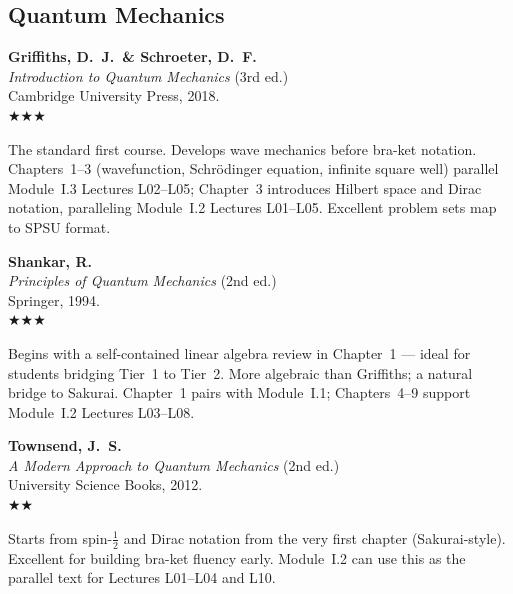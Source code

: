 \documentclass[11pt,a4paper]{article}
\newcommand{\essential}{$\bigstar\bigstar\bigstar$}
\newcommand{\recommended}{$\bigstar\bigstar$}
\newenvironment{bibentry}[1]{%
  \begin{tcolorbox}[entrybox=#1, top=4pt, bottom=4pt]%
}{%
  \end{tcolorbox}\smallskip%
}
\begin{document}
\subsection{Quantum Mechanics}

\begin{bibentry}{t2light}
\textbf{Griffiths, D.~J.\ \& Schroeter, D.~F.}\\
\textit{Introduction to Quantum Mechanics} (3rd ed.)\\
Cambridge University Press, 2018.\\[4pt]
\essential\\[4pt]
\begin{tcolorbox}[annotbox]
The standard first course. Develops wave mechanics before bra-ket notation.
Chapters~1--3 (wavefunction, Schr\"odinger equation, infinite square well) parallel
Module~I.3 Lectures L02--L05; Chapter~3 introduces Hilbert space and Dirac notation,
paralleling Module~I.2 Lectures L01--L05. Excellent problem sets map to SPSU format.
\end{tcolorbox}
\end{bibentry}

\begin{bibentry}{t2light}
\textbf{Shankar, R.}\\
\textit{Principles of Quantum Mechanics} (2nd ed.)\\
Springer, 1994.\\[4pt]
\essential\\[4pt]
\begin{tcolorbox}[annotbox]
Begins with a self-contained linear algebra review in Chapter~1 --- ideal for
students bridging Tier~1 to Tier~2. More algebraic than Griffiths; a natural
bridge to Sakurai. Chapter~1 pairs with Module~I.1; Chapters~4--9 support
Module~I.2 Lectures L03--L08.
\end{tcolorbox}
\end{bibentry}

\begin{bibentry}{t2light}
\textbf{Townsend, J.~S.}\\
\textit{A Modern Approach to Quantum Mechanics} (2nd ed.)\\
University Science Books, 2012.\\[4pt]
\recommended\\[4pt]
\begin{tcolorbox}[annotbox]
Starts from spin-$\tfrac{1}{2}$ and Dirac notation from the very first chapter
(Sakurai-style). Excellent for building bra-ket fluency early. Module~I.2
can use this as the parallel text for Lectures L01--L04 and L10.
\end{tcolorbox}
\end{bibentry}
\end{document}
